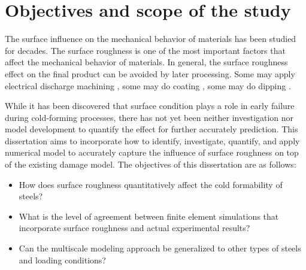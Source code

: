\section{Objectives and scope of the study}\label{ch:intro:se:obj}

The surface influence on the mechanical behavior of materials has been studied for decades. The surface roughness is one of the most important factors that affect the mechanical behavior of materials. In general, the surface roughness effect on the final product can be avoided by later processing. Some may apply electrical discharge machining \autocite{amorimSurfaceModificationTool2017}, some may do coating \autocite{creusCorrosionBehaviourTiN1998}, some may do dipping \autocite{karduckCharacterisationIntermediateLayers1997}.


While it has been discovered that surface condition plays a role in early failure during cold-forming processes, there has not yet been neither investigation nor model development to quantify the effect for further accurately prediction. This dissertation aims to incorporate how to identify, investigate, quantify, and apply numerical model to accurately capture the influence of surface roughness on top of the existing damage model. The objectives of this dissertation are as follows:

\begin{itemize}
    \item  How does surface roughness quantitatively affect the cold formability of steels?
    \item What is the level of agreement between finite element simulations that incorporate surface roughness and actual experimental results?
    \item Can the multiscale modeling approach be generalized to other types of steels and loading conditions?
\end{itemize}

